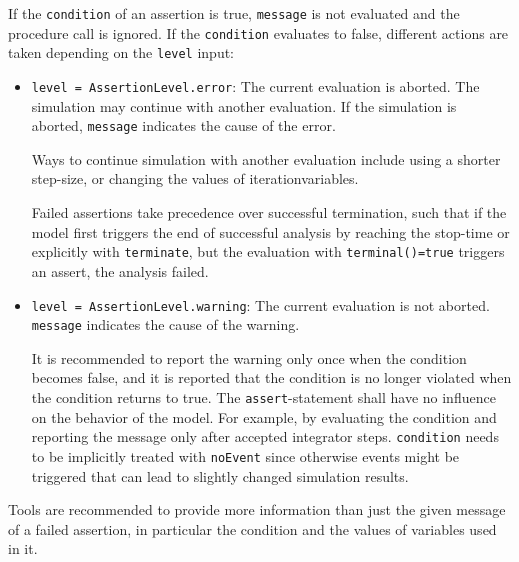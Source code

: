 If the \lstinline!condition! of an assertion is true, \lstinline!message! is not evaluated and the procedure call is ignored.
If the \lstinline!condition! evaluates to false, different actions are taken depending on the \lstinline!level! input:
\begin{itemize}
\item
  \lstinline!level = AssertionLevel.error!:
  The current evaluation is aborted.
  The simulation may continue with another evaluation.
  If the simulation is aborted, \lstinline!message! indicates the cause of the error.
  \begin{nonnormative}
  Ways to continue simulation with another evaluation include using a shorter step-size, or changing the values of iterationvariables.
  \end{nonnormative}
  Failed assertions take precedence over successful termination, such that if the model first triggers the end of successful analysis by reaching the stop-time or explicitly with \lstinline!terminate!, but the evaluation with \lstinline!terminal()=true! triggers an assert, the analysis failed.
\item
  \lstinline!level = AssertionLevel.warning!:
  The current evaluation is not aborted.
  \lstinline!message! indicates the cause of the warning.
  \begin{nonnormative}
  It is recommended to report the warning only once when the condition becomes false, and it is reported that the condition is no longer violated when the condition returns to true.
  The \lstinline!assert!-statement shall have no influence on the behavior of the model.
  For example, by evaluating the condition and reporting the message only after accepted integrator steps.
  \lstinline!condition! needs to be implicitly treated with \lstinline!noEvent! since otherwise events might be triggered that can lead to slightly changed simulation results.
  \end{nonnormative}
\end{itemize}
Tools are recommended to provide more information than just the given message of a failed assertion, in particular the condition and the values of variables used in it.

